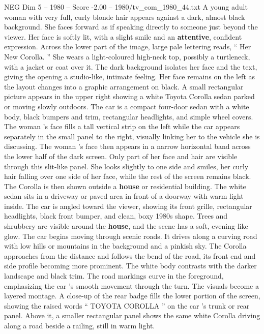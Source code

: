 \begin{textsample}{NEG Dim 5 – 1980 – Score -2.00 – 1980/tv\_com\_1980\_44.txt}  \label{ex:f5_neg_061}
A young adult woman with very full, curly blonde hair appears against a dark, almost black background.
She faces forward as if speaking directly to someone just beyond the viewer.
Her face is softly lit, with a slight smile and an \textbf{attentive}, confident expression.
Across the lower part of the image, large pale lettering reads, “ Her New Corolla. ” She wears a light-coloured high-neck top, possibly a turtleneck, with a jacket or coat over it.
The dark background isolates her face and the text, giving the opening a studio-like, intimate feeling.
Her face remains on the left as the layout changes into a graphic arrangement on black.
A small rectangular picture appears in the upper right showing a white Toyota Corolla sedan parked or moving slowly outdoors.
The car is a compact four-door sedan with a white body, black bumpers and trim, rectangular headlights, and simple wheel covers.
The woman ’s face fills a tall vertical strip on the left while the car appears separately in the small panel to the right, visually linking her to the vehicle she is discussing.
The woman ’s face then appears in a narrow horizontal band across the lower half of the dark screen.
Only part of her face and hair are visible through this slit-like panel.
She looks slightly to one side and smiles, her curly hair falling over one side of her face, while the rest of the screen remains black.
The Corolla is then shown outside a \textbf{house} or residential building.
The white sedan sits in a driveway or paved area in front of a doorway with warm light inside.
The car is angled toward the viewer, showing its front grille, rectangular headlights, black front bumper, and clean, boxy 1980s shape.
Trees and shrubbery are visible around the \textbf{house}, and the scene has a soft, evening-like glow.
The car begins moving through scenic roads.
It drives along a curving road with low hills or mountains in the background and a pinkish sky.
The Corolla approaches from the distance and follows the bend of the road, its front end and side profile becoming more prominent.
The white body contrasts with the darker landscape and black trim.
The road markings curve in the foreground, emphasizing the car ’s smooth movement through the turn.
The visuals become a layered montage.
A close-up of the rear badge fills the lower portion of the screen, showing the raised words “ TOYOTA COROLLA ” on the car ’s trunk or rear panel.
Above it, a smaller rectangular panel shows the same white Corolla driving along a road beside a railing, still in warm light.

\end{textsample}
